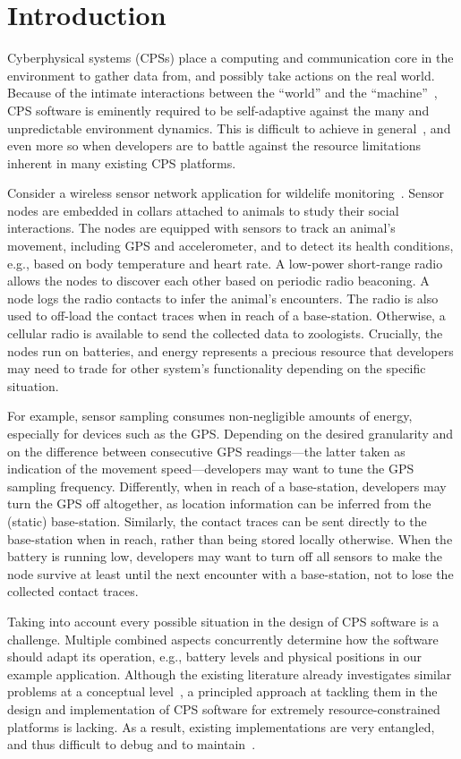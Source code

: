 \section{Introduction}

Cyberphysical systems (CPSs) place a computing and communication core
in the environment to gather data from, and possibly take actions on
the real world. Because of the intimate interactions between the
``world'' and the ``machine''~\cite{jackson}, CPS software is
eminently required to be self-adaptive against the many and
unpredictable environment dynamics. This is difficult to achieve in
general~\cite{}, and even more so when developers are to battle against the
resource limitations inherent in many existing CPS platforms.

 Consider a wireless sensor network application for
wildelife monitoring~\cite{badgers}. Sensor nodes are embedded in
collars attached to animals to study their social interactions. The
nodes are equipped with sensors to track an animal's movement,
including GPS and accelerometer, and to detect its health conditions,
e.g., based on body temperature and heart rate. A low-power
short-range radio allows the nodes to discover each other based on
periodic radio beaconing. A node logs the radio contacts to infer the
animal's encounters. The radio is also used to off-load the contact
traces when in reach of a base-station. Otherwise, a cellular radio is
available to send the collected data to zoologists. Crucially, the
nodes run on batteries, and energy represents a precious resource that
developers may need to trade for other system's functionality
depending on the specific situation.

For example, sensor sampling consumes non-negligible amounts of
energy, especially for devices such as the GPS. Depending on the
desired granularity and on the difference between consecutive GPS
readings---the latter taken as indication of the movement
speed---developers may want to tune the GPS sampling
frequency. Differently, when in reach of a base-station, developers
may turn the GPS off altogether, as location information can be
inferred from the (static) base-station. Similarly, the contact traces
can be sent directly to the base-station when in reach, rather than
being stored locally otherwise.  When the battery is running low,
developers may want to turn off all sensors to make the node survive
at least until the next encounter with a base-station, not to lose the
collected contact traces.

 Taking into account every possible
situation in the design of CPS software is a challenge. Multiple
combined aspects concurrently determine how the software should adapt
its operation, e.g., battery levels and physical positions in our
example application. Although the existing literature already
investigates similar problems at a conceptual level~\cite{}, a
principled approach at tackling them in the design and implementation
of CPS software for extremely resource-constrained platforms is
lacking. As a result, existing implementations are very entangled, and
thus difficult to debug and to maintain~\cite{programmingsurvey}.

